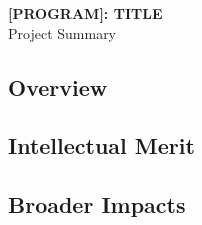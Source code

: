 \documentclass[11pt,oneside,final]{article}
\begin{document}
\begin{center}
    {\large \bf [PROGRAM]: TITLE}\\
    Project Summary
\end{center}

\subsection*{Overview}
%
\subsection*{Intellectual Merit}
%
\subsection*{Broader Impacts}
%
\end{document}
